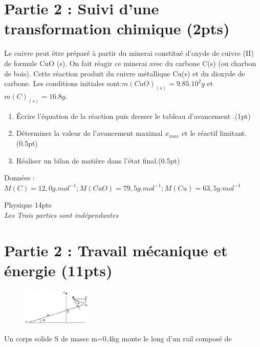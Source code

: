 \documentclass[12pt]{article}
\begin{document}
\section*{Partie 2 : Suivi d’une transformation chimique \dotfill(2pts)}
Le cuivre peut être préparé à partir du minerai constitué d’oxyde de cuivre (II) de formule CuO (s). On fait
réagir ce minerai avec du carbone C(s) (ou charbon de bois). Cette réaction produit du cuivre métallique Cu(s)
et du dioxyde de carbone. Les conditions initiales sont:$ m(CuO)_{(s)} = 9.85.10^2g$ et $m(C)_{(s)}=16.8g$. 
\begin{enumerate}
    \item Écrire l’équation de la réaction puis dresser le tableau d’avancement .\dotfill(1pt)
    \item Déterminer la valeur de l’avancement maximal $x_{max}$ et le réactif limitant.\dotfill(0.5pt)
    \item Réaliser un bilan de matière dans l’état final.\dotfill(0.5pt)

        \end{enumerate}
Données : $M(C) = 12,0 g.mol^{-1} ; M(CuO) = 79,5 g.mol^{-1} ; M(Cu) = 63,5 g.mol^{-1}$


\begin{center}
    \vspace{1cm}
\hrulefill
\Large{Physique 14pts}
\hrulefill\\
    \emph{Les Trois parties sont indépendantes}
\end{center}

\section*{Partie 2 : Travail mécanique et énergie (11pts)}
\begin{figure}

    \includegraphics[width=0.3\textwidth]{./img/img01.png}
\end{figure}
Un corps solide S de masse m=0,4kg monte le long d’un rail composé de
\end{document}
